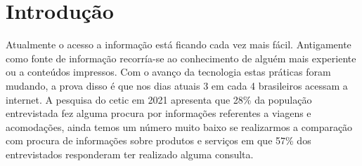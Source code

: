 
\chapter[Introdução]{Introdução}
\label{cap:intro}
\begin{comment}
Neste capítulo precisamos:
\begin{itemize}
    \item Introduzir o contexto
    \item Definir o que entendemos como avaliação de hoteis
    \item Apresentar em linhas gerais quais métodos são usados para detectar fake news, qual o estada da arte atual e quais são suas limitações.
    \item Descrever a nossa proposta e objetivos
    \item Descrever a estrutura do relatório
\end{itemize}

\end{comment}

Atualmente o acesso a informação está ficando cada vez mais fácil. Antigamente como fonte de informação recorría-se ao conhecimento de alguém mais experiente ou a conteúdos impressos. Com o avanço da tecnologia estas práticas foram mudando, a prova disso é que nos dias atuais 3 em cada 4 brasileiros acessam a internet. A pesquisa do cetic em 2021 apresenta que 28\% da população entrevistada fez alguma procura por informações referentes a viagens e acomodações, ainda temos um número muito baixo se realizarmos a comparação com procura de informações sobre produtos e serviços em que 57\% dos entrevistados responderam ter realizado alguma consulta.


